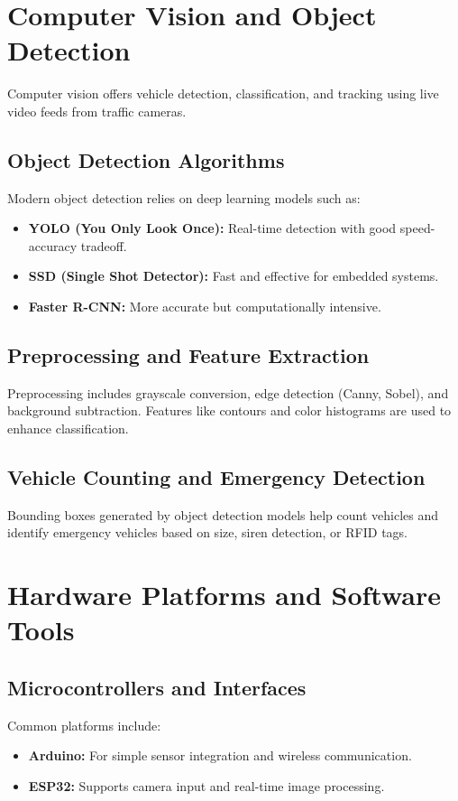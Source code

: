 \section{Computer Vision and Object Detection}

Computer vision offers vehicle detection, classification, and tracking using live video feeds from traffic cameras.

\subsection{Object Detection Algorithms}
Modern object detection relies on deep learning models such as:
\begin{itemize}
    \item \textbf{YOLO (You Only Look Once):} Real-time detection with good speed-accuracy tradeoff.
    \item \textbf{SSD (Single Shot Detector):} Fast and effective for embedded systems.
    \item \textbf{Faster R-CNN:} More accurate but computationally intensive.
\end{itemize}

\subsection{Preprocessing and Feature Extraction}
Preprocessing includes grayscale conversion, edge detection (Canny, Sobel), and background subtraction. Features like contours and color histograms are used to enhance classification.

\subsection{Vehicle Counting and Emergency Detection}
Bounding boxes generated by object detection models help count vehicles and identify emergency vehicles based on size, siren detection, or RFID tags.


\section{Hardware Platforms and Software Tools}

\subsection{Microcontrollers and Interfaces}
Common platforms include:
\begin{itemize}
    \item \textbf{Arduino:} For simple sensor integration and wireless communication.
    \item \textbf{ESP32:} Supports camera input and real-time image processing.
\end{itemize}


